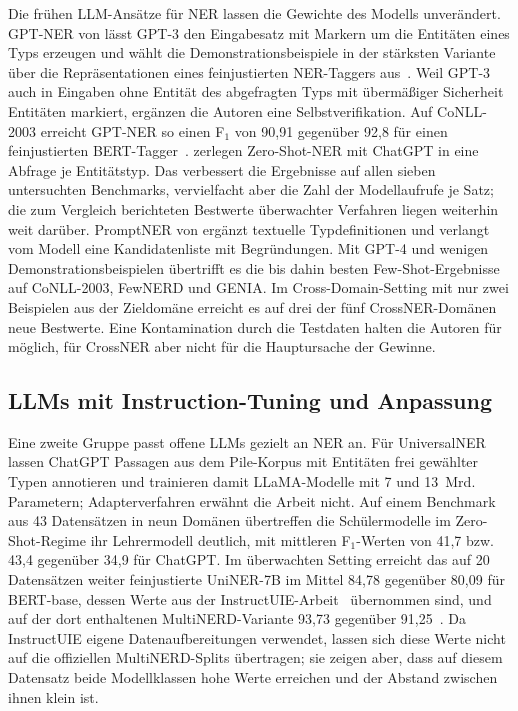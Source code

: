 Die frühen LLM-Ansätze für NER lassen die Gewichte des Modells
unverändert.
GPT-NER von \textcite{wang2025gptner} lässt GPT-3 den Eingabesatz mit
Markern um die Entitäten eines Typs erzeugen und wählt die
Demonstrationsbeispiele in der stärksten Variante über die
Repräsentationen eines feinjustierten
NER-Taggers aus~\cite[Abschn.~3.2.2]{wang2025gptner}.
Weil GPT-3 auch in Eingaben ohne Entität des abgefragten Typs mit
übermäßiger Sicherheit Entitäten markiert, ergänzen die Autoren eine
Selbstverifikation.
Auf CoNLL-2003 erreicht GPT-NER so einen F$_1$ von 90{,}91 gegenüber
92{,}8 für einen feinjustierten BERT-Tagger~\cite[Tab.~1]{wang2025gptner}.
\textcite{xie2023zeroshot} zerlegen Zero-Shot-NER mit ChatGPT in eine
Abfrage je Entitätstyp.
Das verbessert die Ergebnisse auf allen sieben untersuchten
Benchmarks, vervielfacht aber die Zahl der Modellaufrufe je Satz; die
zum Vergleich berichteten Bestwerte überwachter Verfahren liegen weiterhin
weit darüber.
PromptNER von \textcite{ashok2023promptner} ergänzt textuelle
Typdefinitionen und verlangt vom Modell eine Kandidatenliste mit
Begründungen.
Mit GPT-4 und wenigen Demonstrationsbeispielen übertrifft es die
bis dahin besten Few-Shot-Ergebnisse auf CoNLL-2003, FewNERD und GENIA.
Im Cross-Domain-Setting mit nur zwei Beispielen aus der Zieldomäne
erreicht es auf drei der fünf CrossNER-Domänen neue Bestwerte.
Eine Kontamination durch die Testdaten halten die Autoren für möglich,
für CrossNER aber nicht für die Hauptursache der Gewinne.

\subsection{LLMs mit Instruction-Tuning und Anpassung}
\label{sec:k3-angepasst}

Eine zweite Gruppe passt offene LLMs gezielt an NER an.
Für UniversalNER lassen \textcite{zhou2024universalner} ChatGPT Passagen
aus dem Pile-Korpus mit Entitäten frei gewählter Typen annotieren und
trainieren damit LLaMA-Modelle mit 7 und 13~Mrd. Parametern;
Adapterverfahren erwähnt die Arbeit nicht.
Auf einem Benchmark aus 43 Datensätzen in neun Domänen übertreffen die
Schülermodelle im Zero-Shot-Regime ihr Lehrermodell deutlich, mit
mittleren F$_1$-Werten von 41{,}7 bzw. 43{,}4 gegenüber 34{,}9 für
ChatGPT.
Im überwachten Setting erreicht das auf 20 Datensätzen weiter
feinjustierte UniNER-7B im Mittel 84{,}78 gegenüber 80{,}09 für
BERT-base, dessen Werte aus der
InstructUIE-Arbeit~\cite{wang2023instructuie} übernommen sind, und auf
der dort enthaltenen MultiNERD-Variante 93{,}73 gegenüber
91{,}25~\cite[Tab.~2]{zhou2024universalner}.
Da InstructUIE eigene Datenaufbereitungen verwendet, lassen sich diese
Werte nicht auf die offiziellen MultiNERD-Splits übertragen; sie zeigen
aber, dass auf diesem Datensatz beide Modellklassen hohe Werte erreichen
und der Abstand zwischen ihnen klein ist.

